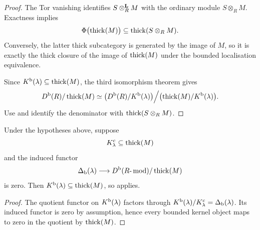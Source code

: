 \begin{proof}
The Tor vanishing identifies \(S\otimes^{\mathbf L}_RM\) with the ordinary module \(S\otimes_RM\).  Exactness implies
\[
 \Phi\bigl(\operatorname{thick}(M)\bigr)
 \subseteq
 \operatorname{thick}(S\otimes_RM).
\]
Conversely, the latter thick subcategory is generated by the image of \(M\), so it is exactly the thick closure of the image of \(\operatorname{thick}(M)\) under the bounded localisation equivalence.

Since \(K^{\mathrm b}(\lambda)\subseteq\operatorname{thick}(M)\), the third isomorphism theorem gives
\[
 D^{\mathrm b}(R)/\operatorname{thick}(M)
 \simeq
 \bigl(D^{\mathrm b}(R)/K^{\mathrm b}(\lambda)\bigr)
 \Big/
 \bigl(\operatorname{thick}(M)/K^{\mathrm b}(\lambda)\bigr).
\]
Use  and identify the denominator with \(\operatorname{thick}(S\otimes_RM)\).
\end{proof}

\begin{corollary}\label{cor:defect-absorption}
Under the hypotheses above, suppose
\[
 K^c_\lambda\subseteq\operatorname{thick}(M)
\]
and the induced functor
\[
 \Delta_{\mathrm b}(\lambda)
 \longrightarrow
 D^{\mathrm b}(R\text{-}\operatorname{mod})/\operatorname{thick}(M)
\]
is zero.  Then \(K^{\mathrm b}(\lambda)\subseteq\operatorname{thick}(M)\), so
 applies.
\end{corollary}

\begin{proof}
The quotient functor on \(K^{\mathrm b}(\lambda)\) factors through
\(K^{\mathrm b}(\lambda)/K^c_\lambda=\Delta_{\mathrm b}(\lambda)\).  Its induced functor is zero by assumption, hence every bounded kernel object maps to zero in the quotient by \(\operatorname{thick}(M)\).
\end{proof}
